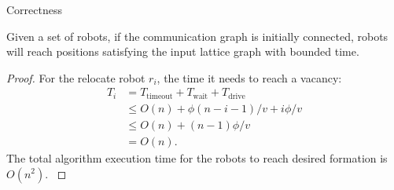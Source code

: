 \begin{frame}{Correctness}
  \begin{theorem}
    Given a set of robots, if the
    communication graph is initially connected, robots will reach
    positions satisfying the input lattice graph with bounded time.
  \end{theorem}
  \begin{proof}
    \small{For the relocate robot $r_i$, the time it needs to reach a vacancy: 
    \begin{equation*}
      \begin{split}
        T_i & = T_{\textrm{timeout}} + T_{\textrm{wait}} + T_{\textrm{drive}} \\
        & \leq O(n) + \phi(n-i-1)/v + i\phi/v  \\
        & \leq O(n) + (n-1)\phi/v\\
        & = O(n).
      \end{split}
    \end{equation*}
    The total algorithm execution time for the robots to reach desired formation is $O(n^2)$.
    }
  \end{proof}
\end{frame}